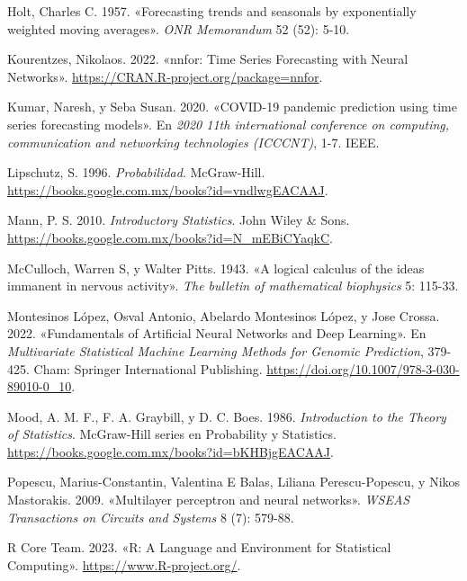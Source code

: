 \documentclass[
  us-letterpaper,
]{scrreprt}
\newlength{\cslhangindent}
\newenvironment{CSLReferences}[2] %
 {\begin{list}{}{%
  \setlength{\itemindent}{0pt}
  \setlength{\leftmargin}{0pt}
  \setlength{\parsep}{0pt}
  \ifodd #1
   \setlength{\leftmargin}{\cslhangindent}
   \setlength{\itemindent}{-1\cslhangindent}
  \fi
  \setlength{\itemsep}{#2\baselineskip}}}
 {\end{list}}
\theoremstyle{plain}
\theoremstyle{definition}
\theoremstyle{definition}
\theoremstyle{plain}
\theoremstyle{remark}
\begin{document}
\begin{CSLReferences}{1}{0}
Holt, Charles C. 1957. {«Forecasting trends and seasonals by
exponentially weighted moving averages»}. \emph{ONR Memorandum} 52 (52):
5-10.

Kourentzes, Nikolaos. 2022. {«nnfor: Time Series Forecasting with Neural
Networks»}. \url{https://CRAN.R-project.org/package=nnfor}.

Kumar, Naresh, y Seba Susan. 2020. {«COVID-19 pandemic prediction using
time series forecasting models»}. En \emph{2020 11th international
conference on computing, communication and networking technologies
(ICCCNT)}, 1-7. IEEE.

Lipschutz, S. 1996. \emph{Probabilidad}. McGraw-Hill.
\url{https://books.google.com.mx/books?id=vndlwgEACAAJ}.

Mann, P. S. 2010. \emph{Introductory Statistics}. John Wiley \& Sons.
\url{https://books.google.com.mx/books?id=N_mEBiCYaqkC}.

McCulloch, Warren S, y Walter Pitts. 1943. {«A logical calculus of the
ideas immanent in nervous activity»}. \emph{The bulletin of mathematical
biophysics} 5: 115-33.

Montesinos López, Osval Antonio, Abelardo Montesinos López, y Jose
Crossa. 2022. {«Fundamentals of Artificial Neural Networks and Deep
Learning»}. En \emph{Multivariate Statistical Machine Learning Methods
for Genomic Prediction}, 379-425. Cham: Springer International
Publishing. \url{https://doi.org/10.1007/978-3-030-89010-0_10}.

Mood, A. M. F., F. A. Graybill, y D. C. Boes. 1986. \emph{Introduction
to the Theory of Statistics}. McGraw-Hill series en Probability y
Statistics. \url{https://books.google.com.mx/books?id=bKHBjgEACAAJ}.

Popescu, Marius-Constantin, Valentina E Balas, Liliana Perescu-Popescu,
y Nikos Mastorakis. 2009. {«Multilayer perceptron and neural networks»}.
\emph{WSEAS Transactions on Circuits and Systems} 8 (7): 579-88.

R Core Team. 2023. {«R: A Language and Environment for Statistical
Computing»}. \url{https://www.R-project.org/}.


\end{CSLReferences}
\end{document}
